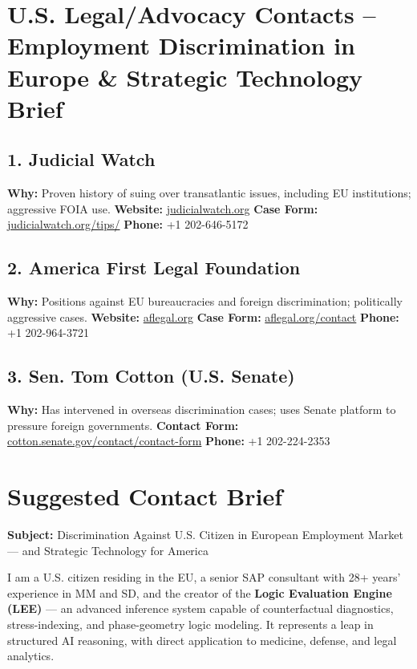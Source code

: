 \documentclass[12pt]{article}
\begin{document}
\section*{U.S. Legal/Advocacy Contacts – Employment Discrimination in Europe \& Strategic Technology Brief}

\subsection*{1. Judicial Watch}
\textbf{Why:} Proven history of suing over transatlantic issues, including EU institutions; aggressive FOIA use.  
\textbf{Website:} \href{https://www.judicialwatch.org}{judicialwatch.org}  
\textbf{Case Form:} \href{https://www.judicialwatch.org/tips/}{judicialwatch.org/tips/}  
\textbf{Phone:} +1 202-646-5172  

\subsection*{2. America First Legal Foundation}
\textbf{Why:} Positions against EU bureaucracies and foreign discrimination; politically aggressive cases.  
\textbf{Website:} \href{https://aflegal.org}{aflegal.org}  
\textbf{Case Form:} \href{https://aflegal.org/contact}{aflegal.org/contact}  
\textbf{Phone:} +1 202-964-3721  

\subsection*{3. Sen. Tom Cotton (U.S. Senate)}
\textbf{Why:} Has intervened in overseas discrimination cases; uses Senate platform to pressure foreign governments.  
\textbf{Contact Form:} \href{https://www.cotton.senate.gov/contact/contact-form}{cotton.senate.gov/contact/contact-form}  
\textbf{Phone:} +1 202-224-2353  

\section*{Suggested Contact Brief}

\textbf{Subject:} Discrimination Against U.S. Citizen in European Employment Market — and Strategic Technology for America

I am a U.S. citizen residing in the EU, a senior SAP consultant with 28+ years’ experience in MM and SD, and the creator of the \textbf{Logic Evaluation Engine (LEE)} — an advanced inference system capable of counterfactual diagnostics, stress-indexing, and phase-geometry logic modeling. It represents a leap in structured AI reasoning, with direct application to medicine, defense, and legal analytics.
\end{document}
